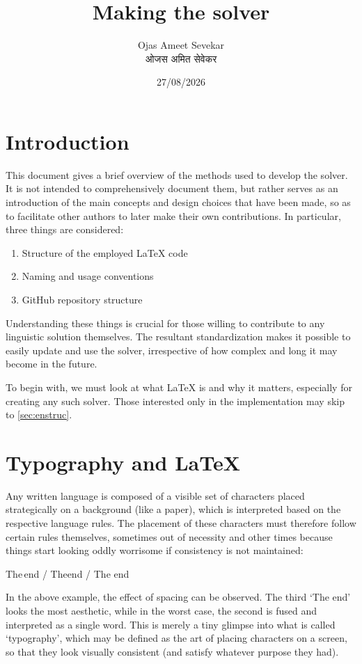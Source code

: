 \documentclass[12pt,twoside]{article}
\title{Making the solver}
\author{Ojas Ameet Sevekar \\ \textsanskrit{ओजस अमित सेवेकर}}
\date{27/08/2026}
\newenvironment{example}{\def\FrameCommand{\colorbox{sampler}} \MakeFramed{\advance\hsize+\width}\begin{center}}{\end{center}\endMakeFramed}
\begin{document}
\begin{titlepage}
\maketitle
\end{titlepage}
\tableofcontents \clearpage

\section{Introduction} \label{sec:enint}
This document gives a brief overview of the methods used to develop the solver. It is not intended to  comprehensively document them, but rather serves as an introduction of the main concepts and design choices that have been made, so as to facilitate other authors to later make their own contributions. In particular, three things are considered:
\begin{enumerate}
\item  Structure of the employed \LaTeX{} code 
\item Naming and usage conventions 
\item GitHub repository structure
\end{enumerate}
Understanding  these things is crucial for those willing  to contribute to any linguistic solution themselves. The resultant standardization  makes it possible to easily update and use the solver, irrespective of how complex and long it may become in the future. 

To begin with, we must look at what \LaTeX{} is and why it matters, especially for creating any such solver. Those interested only in the implementation may skip to \autoref{sec:enstruc}.
\section{Typography and LaTeX} \label{sec:entyp}
Any written language is composed of a visible set of characters placed strategically on a background (like a paper), which is interpreted based on the respective language rules. The placement of these characters must therefore follow certain rules themselves, sometimes out of necessity and other times because things start looking oddly worrisome  if consistency is not maintained:
\begin{example}
The\,end / The\!end / The end
\end{example}
In the above example, the effect of spacing can be observed. The third `The end' looks the most aesthetic, while in the worst case, the second is  fused and interpreted as a single word. This is merely a tiny glimpse into what is called `typography', which may be defined as the art of placing characters on a screen, so that they look visually consistent (and satisfy whatever purpose they had).
\end{document}
